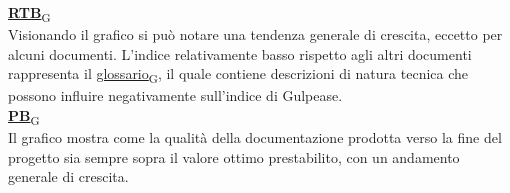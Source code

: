 \begin{flushleft}
\href{https://7last.github.io/docs/pb/documentazione-interna/glossario\#requirements-and-technology-baseline}{\textbf{RTB}\textsubscript{G}} \\
Visionando il grafico si può notare una tendenza generale di crescita, eccetto per alcuni documenti. L'indice relativamente basso rispetto agli altri documenti rappresenta il \href{https://7last.github.io/docs/pb/documentazione-interna/glossario\#glossario}{glossario\textsubscript{G}}, il quale contiene descrizioni di natura tecnica che possono influire negativamente sull'indice di Gulpease. \\
\href{https://7last.github.io/docs/pb/documentazione-interna/glossario\#product-baseline}{\textbf{PB}\textsubscript{G}} \\
Il grafico mostra come la qualità della documentazione prodotta verso la fine del progetto sia sempre sopra il valore ottimo prestabilito, con un andamento generale di crescita. 
\end{flushleft}

\newpage
